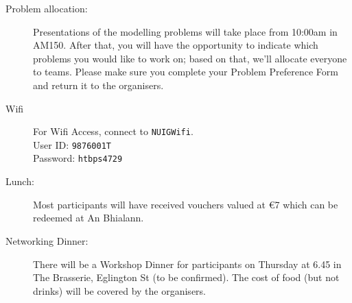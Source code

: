 \documentclass[a4paper, 11pt]{article}
\begin{document}
\begin{description}
\item [Problem allocation:]
  Presentations of the modelling problems will take place from 10:00am in
  AM150. After that, you will have the opportunity to indicate which
  problems you would like to work on; based on that, we'll allocate
  everyone to teams. Please make sure you complete your Problem
  Preference Form and return it to the organisers.


\item[Wifi] For Wifi Access, connect to \texttt{NUIGWifi}.\\
    User ID: \texttt{9876001T}\\
    Password: \texttt{htbps4729}

  \item[Lunch:] Most participants will have received vouchers valued
    at \euro 7 which can be redeemed at An Bhialann.
    
  \item[Networking Dinner:] There will be a Workshop Dinner for
    participants on Thursday at 6.45 in The Brasserie, Eglington St (to be
    confirmed). The cost of food (but not drinks) will be covered by
    the organisers.
  
\end{description}
\end{document}
